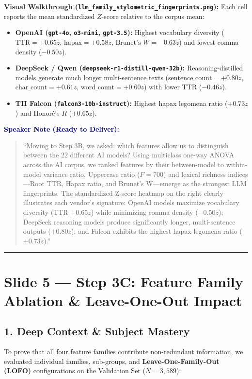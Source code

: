 \documentclass[11pt, a4paper]{article}
\newenvironment{speakernote}{%
    \par\vspace{0.2cm}%
    \noindent\textbf{\textcolor{navy}{Speaker Note (Ready to Deliver):}}\par\vspace{0.1cm}%
    \begin{quote}\itshape\color{slate}%
}{%
    \end{quote}\vspace{0.2cm}%
}
\begin{document}
\noindent\textbf{Visual Walkthrough (\texttt{llm\_family\_stylometric\_fingerprints.png}):}
Each cell reports the mean standardized $Z$-score relative to the corpus mean:
\begin{itemize}[noitemsep]
    \item \textbf{OpenAI (\texttt{gpt-4o}, \texttt{o3-mini}, \texttt{gpt-3.5}):} Highest vocabulary diversity ($\text{TTR} = +0.65z$, $\text{hapax} = +0.58z$, $\text{Brunet's } W = -0.63z$) and lowest comma density ($-0.50z$).
    \item \textbf{DeepSeek / Qwen (\texttt{deepseek-r1-distill-qwen-32b}):} Reasoning-distilled models generate much longer multi-sentence texts ($\text{sentence\_count} = +0.80z$, $\text{char\_count} = +0.61z$, $\text{word\_count} = +0.60z$) with lower TTR ($-0.46z$).
    \item \textbf{TII Falcon (\texttt{falcon3-10b-instruct}):} Highest hapax legomena ratio ($+0.73z$) and Honor\'e's $R$ ($+0.65z$).
\end{itemize}

\begin{speakernote}
``Moving to Step 3B, we asked: which features allow us to distinguish between the 22 different AI models? Using multiclass one-way ANOVA across the AI corpus, we ranked features by their between-model to within-model variance ratio. Uppercase ratio ($F = 700$) and lexical richness indices---Root TTR, Hapax ratio, and Brunet's W---emerge as the strongest LLM fingerprints. The standardized Z-score heatmap on the right clearly illustrates each vendor's signature: OpenAI models maximize vocabulary diversity (TTR $+0.65z$) while minimizing comma density ($-0.50z$); DeepSeek reasoning models produce significantly longer, multi-sentence outputs ($+0.80z$); and Falcon exhibits the highest hapax legomena ratio ($+0.73z$).''
\end{speakernote}

\vspace{0.3cm}\hrule\vspace{0.3cm}

\section{Slide 5 --- Step 3C: Feature Family Ablation \& Leave-One-Out Impact}

\subsection*{1. Deep Context \& Subject Mastery}
To prove that all four feature families contribute non-redundant information, we evaluated individual families, sub-groups, and \textbf{Leave-One-Family-Out (LOFO)} configurations on the Validation Set ($N = 3,589$):
\end{document}
